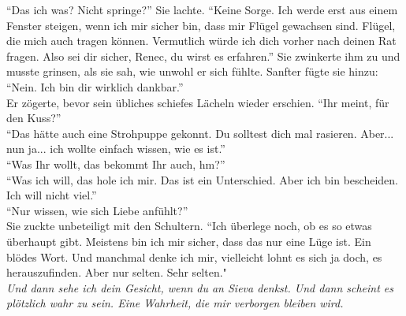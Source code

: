 ``Das ich was? Nicht springe?'' Sie lachte. ``Keine Sorge. Ich werde erst aus einem Fenster 
steigen, wenn ich mir sicher bin, dass mir Flügel gewachsen sind. Flügel, die mich auch tragen 
können. Vermutlich würde ich dich vorher nach deinen Rat fragen. Also sei dir sicher, Renec, du 
wirst es erfahren.'' Sie zwinkerte ihm zu und musste grinsen, als sie sah, wie unwohl er sich 
fühlte. Sanfter fügte sie hinzu: ``Nein. Ich bin dir wirklich dankbar.''\\
Er zögerte, bevor sein übliches schiefes Lächeln wieder erschien. ``Ihr meint, für den Kuss?''\\
``Das hätte auch eine Strohpuppe gekonnt. Du solltest dich mal rasieren. Aber... nun ja... ich 
wollte einfach wissen, wie es ist.''\\
``Was Ihr wollt, das bekommt Ihr auch, hm?''\\
``Was ich will, das hole ich mir. Das ist ein Unterschied. Aber ich bin bescheiden. Ich will nicht 
viel.''\\
``Nur wissen, wie sich Liebe anfühlt?''\\
Sie zuckte unbeteiligt mit den Schultern. ``Ich überlege noch, ob es so etwas überhaupt gibt. 
Meistens bin ich mir sicher, dass das nur eine Lüge ist. Ein blödes Wort. Und manchmal denke ich 
mir, vielleicht lohnt es sich ja doch, es herauszufinden. Aber nur selten. Sehr selten."\\
\textit{Und dann sehe ich dein Gesicht, wenn du an Sieva denkst. Und dann scheint es plötzlich wahr 
zu sein. Eine Wahrheit, die mir verborgen bleiben wird.}
